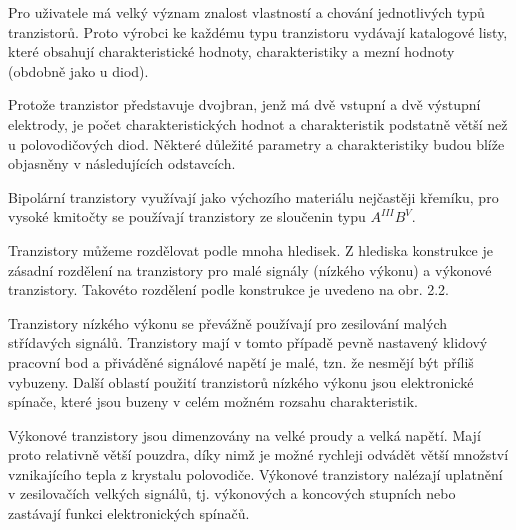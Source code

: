     Pro uživatele má velký význam znalost vlastností a chování jednotlivých typů tranzistorů. Proto
    výrobci ke každému typu tranzistoru vydávají katalogové listy, které obsahují charakteristické
    hodnoty, charakteristiky a mezní hodnoty (obdobně jako u diod).
    
    Protože tranzistor představuje dvojbran, jenž má dvě vstupní a dvě výstupní elektrody, je počet
    charakteristických hodnot a charakteristik podstatně větší než u polovodičových diod. Některé
    důležité parametry a charakteristiky budou blíže objasněny v následujících odstavcích.
    
    Bipolární tranzistory využívají jako výchozího materiálu nejčastěji křemíku, pro vysoké kmitočty
    se používají tranzistory ze sloučenin typu \(A^{III}B^{V}\).
    
    Tranzistory můžeme rozdělovat podle mnoha hledisek. Z hlediska konstrukce je zásadní rozdělení
    na tranzistory pro malé signály (nízkého výkonu) a výkonové tranzistory. Takovéto rozdělení
    podle konstrukce je uvedeno na obr. 2.2.
    
    Tranzistory nízkého výkonu se převážně používají pro zesilování malých střídavých signálů.
    Tranzistory mají v tomto případě pevně nastavený klidový pracovní bod a přiváděné signálové
    napětí je malé, tzn. že nesmějí být příliš vybuzeny. Další oblastí použití tranzistorů nízkého
    výkonu jsou elektronické spínače, které jsou buzeny v celém možném rozsahu charakteristik.
    
    Výkonové tranzistory jsou dimenzovány na velké proudy a velká napětí. Mají proto relativně větší
    pouzdra, díky nimž je možné rychleji odvádět větší množství vznikajícího tepla z krystalu
    polovodiče. Výkonové tranzistory nalézají uplatnění v zesilovačích velkých signálů, tj.
    výkonových a koncových stupních nebo zastávají funkci elektronických spínačů.

